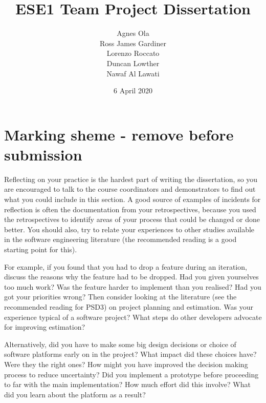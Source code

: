 \documentclass{l3proj}
\begin{document}
\title{ESE1 Team Project Dissertation}

\author{Agnes Ola \\
        Ross James Gardiner \\
        Lorenzo Roccato \\
        Duncan Lowther \\
        Nawaf Al Lawati}

\date{6 April 2020}

\maketitle

\begin{abstract}


\end{abstract}

\educationalconsent

\newpage

\section{Marking sheme - remove before submission}

Reflecting on your practice is the hardest part of writing the dissertation, so you are encouraged to talk to the course coordinators and demonstrators to find out what you could include in this section. A good source of examples of incidents for reflection is often the documentation from your retrospectives, because you used the retrospectives to identify areas of your process that could be changed or done better. You should also, try to relate your experiences to other studies available in the software engineering literature (the recommended reading is a good starting point for this).

For example, if you found that you had to drop a feature during an iteration, discuss the reasons why the feature had to be dropped. Had you given yourselves too much work? Was the feature harder to implement than you realised? Had you got your priorities wrong? Then consider looking at the literature (see the recommended reading for PSD3) on project planning and estimation. Was your experience typical of a software project? What steps do other developers advocate for improving estimation?

Alternatively, did you have to make some big design decisions or choice of software platforms early on in the project? What impact did these choices have? Were they the right ones? How might you have improved the decision making process to reduce uncertainty? Did you implement a prototype before proceeding to far with the main implementation? How much effort did this involve? What did you learn about the platform as a result?
\end{document}
